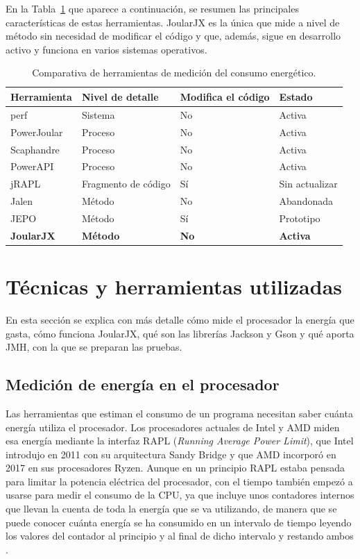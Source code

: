 En la Tabla~\ref{tab:herramientas} que aparece a continuación, se resumen las principales características de
estas herramientas. JoularJX es la única que mide a nivel de método sin
necesidad de modificar el código y que, además, sigue en desarrollo activo y funciona en varios sistemas operativos.

\begin{table}[h]
	\centering
	\begin{tabular}{|l|l|l|l|}
		\hline
		\textbf{Herramienta} & \textbf{Nivel de detalle} & \textbf{Modifica el código} & \textbf{Estado} \\
		\hline
		perf & Sistema & No & Activa \\
		PowerJoular & Proceso & No & Activa \\
		Scaphandre & Proceso & No & Activa \\
		PowerAPI & Proceso & No & Activa \\
		jRAPL & Fragmento de código & Sí & Sin actualizar \\
		Jalen & Método & No & Abandonada \\
		JEPO & Método & Sí & Prototipo \\
		\textbf{JoularJX} & \textbf{Método} & \textbf{No} & \textbf{Activa} \\
		\hline
	\end{tabular}
	\caption{Comparativa de herramientas de medición del consumo energético.}
	\label{tab:herramientas}
\end{table}

\section{Técnicas y herramientas utilizadas}
\label{sec:tecnicas-utilizadas}

En esta sección se explica con más detalle cómo mide el procesador la energía
que gasta, cómo funciona JoularJX, qué son las librerías Jackson y Gson y qué
aporta JMH, con la que se preparan las pruebas.

\subsection{Medición de energía en el procesador}
\label{subsec:rapl}

Las herramientas que estiman el consumo de un programa necesitan saber cuánta energía utiliza el procesador. Los procesadores actuales de Intel y AMD miden esa energía mediante la interfaz RAPL (\emph{Running Average Power Limit}), que Intel introdujo en 2011 con su arquitectura Sandy Bridge y que AMD incorporó en 2017 en sus procesadores Ryzen. Aunque en un principio RAPL estaba pensada para limitar la potencia eléctrica del procesador, con el tiempo también empezó a usarse para medir el consumo de la CPU, ya que incluye unos contadores internos que llevan la cuenta de toda la energía que se va utilizando, de manera que se puede conocer cuánta energía se ha consumido en un intervalo de tiempo leyendo los valores del contador al principio y al final de dicho intervalo y restando ambos \cite{khan2018rapl}.


